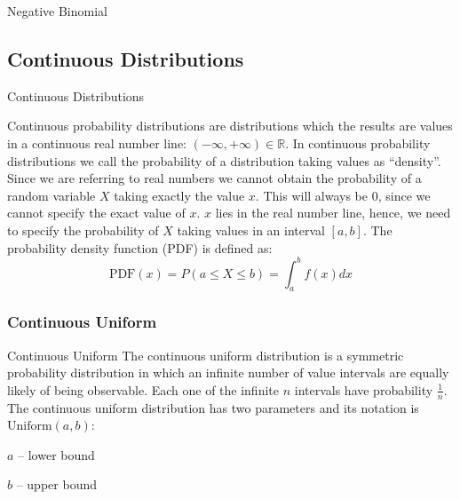 \begin{frame}[noframenumbering]{Negative Binomial}
	\centering
\end{frame}


\subsection*{Continuous Distributions}
\begin{frame}[noframenumbering]{Continuous Distributions}
	\begin{defn}
		\small
		Continuous probability distributions are distributions which
		the results are values in a continuous real number line:
		$(-\infty, +\infty) \in \mathbb{R}$.
		In continuous probability distributions we call the probability
		of a distribution taking values as ``density''.
		Since we are referring to real numbers we cannot obtain the
		probability of a random variable $X$ taking exactly the value $x$.
		This will always be $0$, since we cannot specify the exact
		value of $x$. $x$ lies in the real number line, hence,
		we need to specify the probability of $X$ taking values in an
		interval $[a,b]$.
		The probability density function (PDF) is defined as:
		$$\text{PDF}(x) = P(a \leq X \leq b) = \int_a^b f(x) dx$$
	\end{defn}
\end{frame}

\subsubsection*{Continuous Uniform}
\begin{frame}[noframenumbering]{Continuous Uniform}
	The continuous uniform distribution is a symmetric probability distribution
	in which an infinite number of value intervals are equally likely of being observable.
	Each one of the infinite $n$ intervals have probability $\frac{1}{n}$.
	\vfill
	The continuous uniform distribution has two parameters and its notation is $\text{Uniform}(a, b)$:
	\begin{vfilleditems}
		\item $a$ -- lower bound
		\item $b$ -- upper bound
	\end{vfilleditems}
\end{frame}

